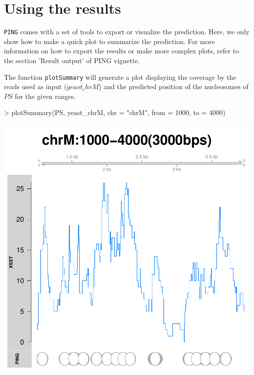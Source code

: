 \documentclass[11pt]{article}
\begin{document}
\section{Using the results}
\texttt{PING} comes with a set of tools to export or visualize the prediction.
Here, we only show how to make a quick plot to summarize the prediction. For
more information on how to export the results or make more complex plots, refer
to the section 'Result output' of PING vignette.

The function \texttt{plotSummary} will generate a plot displaying the coverage
by the reads used as input ($yeast_chrM$) and the predicted position of the
nucleosomes of $PS$ for the given ranges.

\begin{Schunk}
\begin{Sinput}
> plotSummary(PS, yeast_chrM, chr = "chrM", from = 1000, to = 4000)
\end{Sinput}
\end{Schunk}
\includegraphics{PING-PE-plotSummary}
\end{document}
